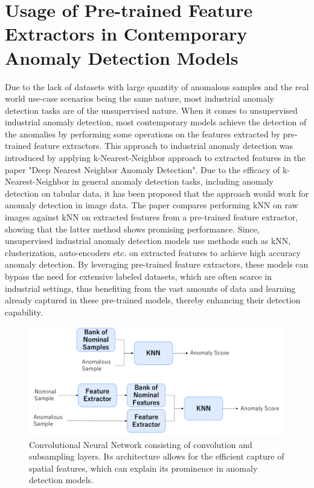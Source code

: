 \section{Usage of Pre-trained Feature Extractors in Contemporary Anomaly Detection Models}
\label{feature extractors}
Due to the lack of datasets with large quantity of anomalous samples and the real world use-case scenarios being the same nature, most industrial anomaly detection tasks are of the unsupervised nature. When it comes to unsupervised industrial anomaly detection, most contemporary models achieve the detection of the anomalies by performing some operations on the features extracted by pre-trained feature extractors. This approach to industrial anomaly detection was introduced by applying k-Nearest-Neighbor approach to extracted features in the paper "Deep Nearest Neighbor Anomaly Detection". Due to the efficacy of k-Nearest-Neighbor in general anomaly detection tasks, including anomaly detection on tabular data, it has been proposed that the approach would work for anomaly detection in image data. The paper compares performing kNN on raw images against kNN on extracted features from a pre-trained feature extractor, showing that the latter method shows promising performance. Since, unsupervised industrial anomaly detection models use methods such as kNN, clusterization, auto-encoders etc. on extracted features to achieve high accuracy anomaly detection. By leveraging pre-trained feature extractors, these models can bypass the need for extensive labeled datasets, which are often scarce in industrial settings, thus benefiting from the vast amounts of data and learning already captured in these pre-trained models, thereby enhancing their detection capability.

\begin{figure}[h]
	\begin{center}
		\includegraphics[width=1.0\linewidth]{Chapter_3/feature_extractor_usage.png}
	\end{center}
	\caption{Convolutional Neural Network consisting of convolution and subsampling layers. Its architecture allows for the efficient capture of spatial features, which can explain its prominence in anomaly detection models.}
	\label{fig:cnn}
\end{figure} 	


